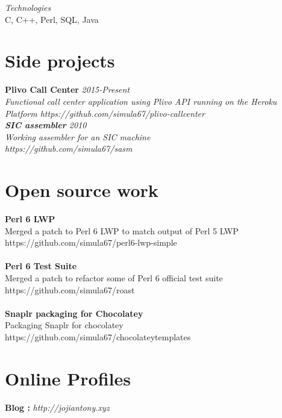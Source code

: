 \documentclass[line,margin]{res}
\begin{document}
\begin{resume}
{\it{Technologies}}\\
C, C++, Perl, SQL, Java

\section{Side projects}
{\bf Plivo Call Center} \hfill \it{2015-Present}\\
Functional call center application using Plivo API running on the Heroku Platform
https://github.com/simula67/plivo-callcenter\\

{\bf SIC assembler} \hfill \it{2010}\\ 
Working assembler for an SIC machine\\
https://github.com/simula67/sasm\\

\section{Open source work}
{\bf Perl 6 LWP}\\
Merged a patch to Perl 6 LWP to match output of Perl 5 LWP\\
https://github.com/simula67/perl6-lwp-simple\\ \\
{\bf Perl 6 Test Suite}\\
Merged a patch to refactor some of Perl 6 official test suite\\
https://github.com/simula67/roast\\ \\
{\bf Snaplr packaging for Chocolatey}\\
Packaging Snaplr for chocolatey\\
https://github.com/simula67/chocolateytemplates\\

\section{Online Profiles}
{\bf Blog :} \it{http://jojiantony.xyz} \\

\end{resume}
\end{document}
